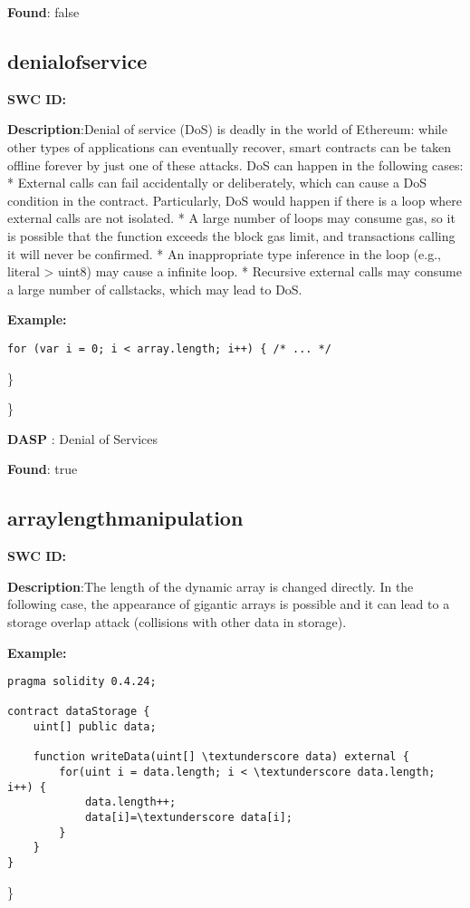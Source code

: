 \documentclass{article}
\begin{document}
\textbf{Found}: false

\subsection{denial\textunderscore of\textunderscore service} 
\textbf{SWC \textunderscore ID:} 

\textbf{Description}:Denial of service (DoS) is deadly in the world of Ethereum: while other types of applications can eventually recover, smart contracts can be taken offline forever by just one of these attacks. DoS can happen in the following cases:
* External calls can fail accidentally or deliberately, which can cause a DoS condition in the contract. Particularly, DoS would happen if there is a loop where external calls are not isolated.
* A large number of loops may consume gas, so it is possible that the function exceeds the block gas limit, and transactions calling it will never be confirmed.
* An inappropriate type inference in the loop (e.g., literal \textendash > uint8) may cause a infinite loop.
* Recursive external calls may consume a large number of callstacks, which may lead to DoS.


\textbf{Example:} 
\begin{verbatim}
for (var i = 0; i < array.length; i++) { /* ... */

\end{verbatim}\} 

\} 

\textbf{DASP} : Denial of Services

\textbf{Found}: true

\subsection{array\textunderscore length\textunderscore manipulation} 
\textbf{SWC \textunderscore ID:} 

\textbf{Description}:The length of the dynamic array is changed directly. In the following case, the appearance of gigantic arrays is possible and it can lead to a storage overlap attack (collisions with other data in storage).


\textbf{Example:} 
\begin{verbatim}
pragma solidity 0.4.24;

contract dataStorage {
    uint[] public data;

    function writeData(uint[] \textunderscore data) external {
        for(uint i = data.length; i < \textunderscore data.length; i++) {
            data.length++;
            data[i]=\textunderscore data[i];
        }
    }
}

\end{verbatim}\} 
\end{document}
